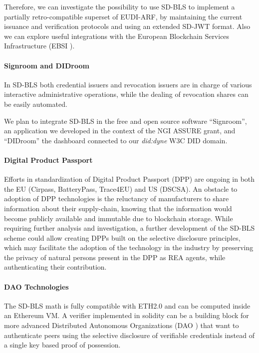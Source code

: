 Therefore, we can investigate the possibility to use SD-BLS to
implement a partially retro-compatible superset of EUDI-ARF, by
maintaining the current issuance and verification protocols and using
an extended SD-JWT format. Also we can explore useful integrations
with the European Blockchain Services Infrastructure (EBSI
\cite{ebsi}).

\paragraph{Signroom and DIDroom}

In SD-BLS both credential issuers and revocation issuers are in charge
of various interactive administrative operations, while the dealing of
revocation shares can be easily automated.

We plan to integrate SD-BLS in the free and open source software
``Signroom'', an application we developed in the context of the NGI
ASSURE grant, and ``DIDroom'' the dashboard connected to our
\emph{did:dyne} W3C DID domain.

\paragraph{Digital Product Passport}
Efforts in standardization of Digital Product Passport (DPP) are
ongoing in both the EU (Cirpass, BatteryPass, Trace4EU) and US
(DSCSA). An obstacle to adoption of DPP technologies is the reluctancy
of manufacturers to share information about their supply-chain,
knowing that the information would become publicly available and
immutable due to blockchain storage. While requiring further analysis
and investigation, a further development of the SD-BLS scheme could
allow creating DPPs built on the selective disclosure principles,
which may facilitate the adoption of the technology in the industry by
preserving the privacy of natural persons present in the DPP as REA
agents\cite{reflow}, while authenticating their contribution.

\paragraph{DAO Technologies}
The SD-BLS math is fully compatible with ETH2.0 and can be computed
inside an Ethereum VM. A verifier implemented in solidity can be a
building block for more advanced Distributed Autonomous Organizations
(DAO \cite{dao}) that want to authenticate peers using the selective
disclosure of verifiable credentials instead of a single key based
proof of possession.


